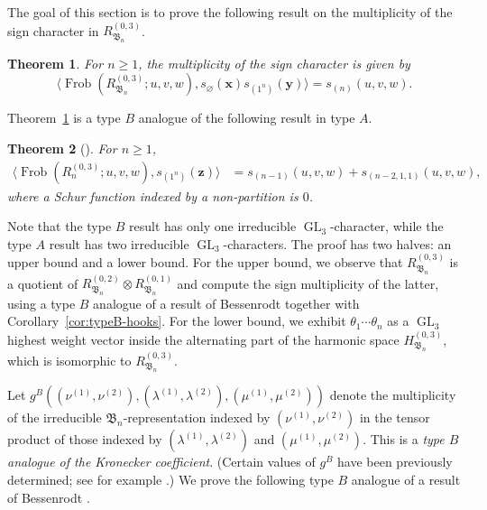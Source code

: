 \documentclass[12pt]{amsart}
\theoremstyle{plain}
\newtheorem{theorem}{Theorem}[section]
\theoremstyle{definition}
\DeclareMathOperator{\Frob}{Frob}
\DeclareMathOperator{\GL}{GL}
\newcommand{\x}{\mathbf{x}}
\newcommand{\y}{\mathbf{y}}
\newcommand{\z}{\mathbf{z}}
\begin{document}
The goal of this section is to prove the following result on the multiplicity of the sign character in $R_{\mathfrak{B}_n}^{(0,3)}$.
\begin{theorem}\label{thm:03sgn}
    For $n \geq 1$, the multiplicity of the sign character is given by
    \begin{equation}
        \langle \Frob(R_{\mathfrak{B}_n}^{(0,3)};u,v,w),s_{\varnothing}(\x) s_{(1^n)}(\y) \rangle =s_{(n)}(u,v,w).
    \end{equation}
\end{theorem}
Theorem~\ref{thm:03sgn} is a type $B$ analogue of the following result in type $A$.
\begin{theorem}[\cite{lentfer2026signcharactertriagonalfermionic}]\label{thm:A03-sign}
For $n \geq 1$,
\begin{equation}
    \begin{aligned}
        \langle \Frob(R_n^{(0,3)};u,v,w), s_{(1^n)}(\z)\rangle &= s_{(n-1)}(u,v,w)+s_{(n-2,1,1)}(u,v,w),
    \end{aligned}
\end{equation}
where a Schur function indexed by a non-partition is $0$.
\end{theorem}
Note that the type $B$ result has only one irreducible $\GL_3$-character, while the type $A$ result has two irreducible $\GL_3$-characters.
The proof has two halves: an upper bound and a lower bound.
For the upper bound, we observe that $R_{\mathfrak{B}_n}^{(0,3)}$ is a quotient of $R_{\mathfrak{B}_n}^{(0,2)} \otimes R_{\mathfrak{B}_n}^{(0,1)}$ and compute the sign multiplicity of the latter, using a type $B$ analogue of a result of Bessenrodt together with Corollary~\ref{cor:typeB-hooks}. 
For the lower bound, we exhibit $\theta_1\cdots\theta_n$ as a $\GL_3$ highest weight vector inside the alternating part of the harmonic space $H_{\mathfrak{B}_n}^{(0,3)}$, which is isomorphic to $R_{\mathfrak{B}_n}^{(0,3)}$.

Let $g^B((\nu^{(1)},\nu^{(2)}), (\lambda^{(1)},\lambda^{(2)}), (\mu^{(1)},\mu^{(2)}))$ denote the multiplicity of the irreducible $\mathfrak{B}_n$-representation indexed by $(\nu^{(1)},\nu^{(2)})$ in the tensor product of those indexed by $(\lambda^{(1)},\lambda^{(2)})$ and $(\mu^{(1)},\mu^{(2)})$. 
This is a \emph{type $B$ analogue of the Kronecker coefficient}.
(Certain values of $g^B$ have been previously determined; see for example \cite[Section 2]{Orellana}.)
We prove the following type $B$ analogue of a result of Bessenrodt \cite{Bessenrodt}. 
\end{document}
